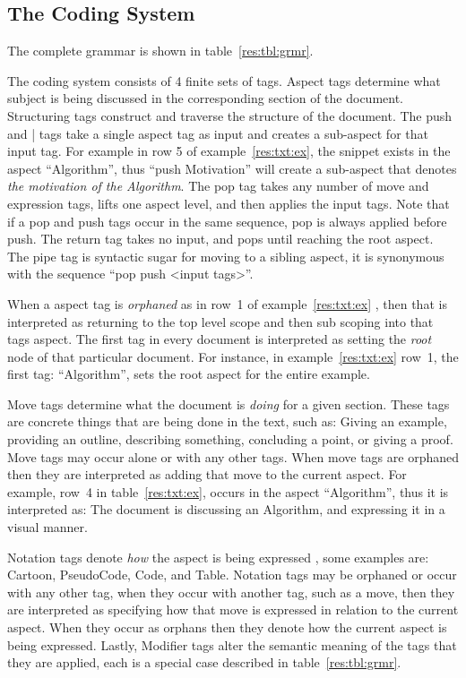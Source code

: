 \documentclass[sigconf]{acmart}
\begin{document}
\subsection{The Coding System}
\label{sec:res:sys}

The complete grammar is shown in table~\ref{res:tbl:grmr}.





The coding system consists of 4 finite sets of tags. Aspect tags determine what
subject is being discussed in the corresponding section of the document.
%
Structuring tags construct and traverse the structure of the document. The
push and | tags take a single aspect tag as input and creates a sub-aspect
for that input tag. For example in row 5 of example~\ref{res:txt:ex}, the
snippet exists in the aspect ``Algorithm'', thus ``push Motivation'' will
create a sub-aspect that denotes \emph{the motivation of the Algorithm}.
%
The pop tag takes any number of move and expression tags, lifts one aspect
level, and then applies the input tags. Note that if a pop and push tags occur
in the same sequence, pop is always applied before push. The return tag takes no
input, and pops until reaching the root aspect. The pipe tag is syntactic sugar
for moving to a sibling aspect, it is synonymous with the sequence ``pop push
<input tags>''.


When a aspect tag is \emph{orphaned} as in row~1 of example~\ref{res:txt:ex}
, then that is interpreted as returning to the
top level scope and then sub scoping into that tags aspect. The first tag in
every document is interpreted as setting the \emph{root} node of that particular
document. For instance, in example~\ref{res:txt:ex} row~1, the first tag:
``Algorithm'', sets the root aspect for the entire example.

Move tags determine what the document is \emph{doing} for a given section.
These tags are concrete things that are being done in the text, such as: Giving
an example, providing an outline, describing something, concluding a point, or
giving a proof. Move tags may occur alone or with any other tags. When move
tags are orphaned then they are interpreted as adding that move to the current
aspect. For example, row~4 in table~\ref{res:txt:ex}, occurs in the
aspect ``Algorithm'', thus it is interpreted as: The document is discussing
an Algorithm, and expressing it in a visual manner.

Notation tags denote \emph{how} the aspect is being expressed , some examples
are: Cartoon, PseudoCode, Code, and Table. Notation tags may be orphaned or
occur with any other tag, when they occur with another tag, such as a move, then
they are interpreted as specifying how that move is expressed in relation to the
current aspect. When they occur as orphans then they denote how the current
aspect is being expressed. Lastly, Modifier tags alter the semantic meaning of
the tags that they are applied, each is a special case described in
table~\ref{res:tbl:grmr}.
%
\end{document}
